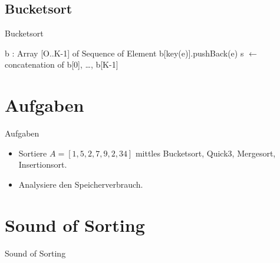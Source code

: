 \documentclass[18pt]{beamer}
\begin{document}
\subsection{Bucketsort}
\begin{frame}[fragile]{Bucketsort}
 \begin{algorithmic}
    \State b : Array [O..K-1] of Sequence of Element
      \State b[key(e)].pushBack(e)
    \EndFor
    \State s $\gets$ concatenation of b[0], \ldots, b[K-1]
  \EndProcedure
 \end{algorithmic}

\end{frame}

\section{Aufgaben}

\begin{frame}{Aufgaben}
\begin{itemize}
 \item Sortiere $A = [1,5,2,7,9,2,34]$ mittles Bucketsort, Quick3, Mergesort, Insertionsort.
 \item Analysiere den Speicherverbrauch.
\end{itemize}
\end{frame}

\section{Sound of Sorting}
\begin{frame}{Sound of Sorting}
 
\end{frame}
\end{document}
